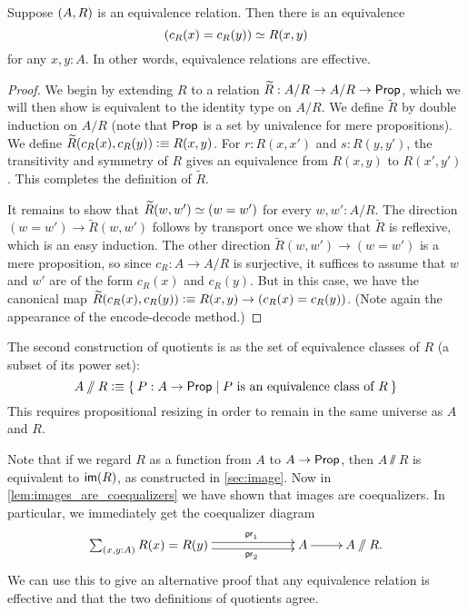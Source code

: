 \begin{lem}\label{lem:sets_exact}
Suppose ${\mathopen{}(A,R)\mathclose{}}$ is an equivalence relation. Then there is an equivalence
\begin{equation*}
(c_R(x)= c_R(y))\simeq R(x,y)
\end{equation*}
for any $x,y:A$. In other words, equivalence relations are effective.
\end{lem}

\begin{proof}
We begin by extending $R$ to a relation $\widetilde{R}:A/R\to A/R\to\mathsf{Prop}$, which we will then show is equivalent
to the identity type on $A/R$. We define $\widetilde{R}$ by double induction on
$A/R$ (note that $\mathsf{Prop}$ is a set by univalence for mere propositions). We
define $\widetilde{R}(c_R(x),c_R(y)) \vcentcolon\equiv R(x,y)$. For $r:R(x,x')$ and $s:R(y,y')$,
the transitivity and symmetry
of $R$ gives an equivalence from $R(x,y)$ to $R(x',y')$. This completes the
definition of $\widetilde{R}$.

It remains to show that $\widetilde{R}(w,w')\simeq (w= w')$ for every $w,w':A/R$.
The direction $(w=w')\to \widetilde{R}(w,w')$ follows by transport once we show that $\widetilde{R}$ is reflexive, which is an easy induction.
The other direction $\widetilde{R}(w,w')\to (w= w')$ is a mere proposition, so since $c_R:A\to A/R$ is surjective, it suffices to assume that $w$ and $w'$ are of the form $c_R(x)$ and $c_R(y)$.
But in this case, we have the canonical map $\widetilde{R}(c_R(x),c_R(y)) \vcentcolon\equiv R(x,y) \to (c_R(x)=c_R(y))$.
(Note again the appearance of the encode-decode method.)
\end{proof}

The second construction of quotients is as the set of equivalence classes of $R$ (a subset
of its power set):
\[ A\sslash R \defeq \setof{ P:A\to\prop | P \text{ is an equivalence class of } R} \]
This requires propositional resizing in order to remain in the same universe as $A$ and $R$.

Note that if we regard $R$ as a function from $A$ to $A\to \mathsf{Prop}$, then $A\sslash R$ is equivalent to $\mathsf{im}(R)$, as constructed in \cref{sec:image}.
Now in \cref{lem:images_are_coequalizers} we have shown that images are
coequalizers. In particular, we immediately get the coequalizer diagram
\begin{equation*}
  \xymatrix{
    **[l]{\sm{x,y:A} R (x)= R (y)}
    \ar@<0.25em>[r]^{\proj1}
    \ar@<-0.25em>[r]_{\proj2}
    &
    {A}
    \ar[r]
    &
    {A \sslash R.}
  }
\end{equation*}
We can use this to give an alternative proof that any equivalence relation is effective and that the two definitions of quotients agree.


